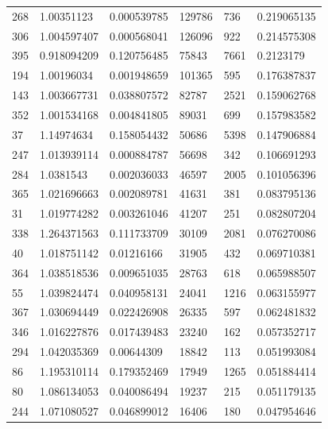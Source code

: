 \documentclass[withoutpreface,bwprint]{cumcmthesis}
\begin{document}
\begin{longtable}{l|llll|l}
    268  & 1.00351123   & 0.000539785  & 129786   & 736            & 0.219065135    \\
    306  & 1.004597407  & 0.000568041  & 126096   & 922            & 0.214575308    \\
    395  & 0.918094209  & 0.120756485  & 75843    & 7661           & 0.2123179      \\
    194  & 1.00196034   & 0.001948659  & 101365   & 595            & 0.176387837    \\
    143  & 1.003667731  & 0.038807572  & 82787    & 2521           & 0.159062768    \\
    352  & 1.001534168  & 0.004841805  & 89031    & 699            & 0.157983582    \\
    37   & 1.14974634   & 0.158054432  & 50686    & 5398           & 0.147906884    \\
    247  & 1.013939114  & 0.000884787  & 56698    & 342            & 0.106691293    \\
    284  & 1.0381543    & 0.002036033  & 46597    & 2005           & 0.101056396    \\
    365  & 1.021696663  & 0.002089781  & 41631    & 381            & 0.083795136    \\
    31   & 1.019774282  & 0.003261046  & 41207    & 251            & 0.082807204    \\
    338  & 1.264371563  & 0.111733709  & 30109    & 2081           & 0.076270086    \\
    40   & 1.018751142  & 0.01216166   & 31905    & 432            & 0.069710381    \\
    364  & 1.038518536  & 0.009651035  & 28763    & 618            & 0.065988507    \\
    55   & 1.039824474  & 0.040958131  & 24041    & 1216           & 0.063155977    \\
    367  & 1.030694449  & 0.022426908  & 26335    & 597            & 0.062481832    \\
    346  & 1.016227876  & 0.017439483  & 23240    & 162            & 0.057352717    \\
    294  & 1.042035369  & 0.00644309   & 18842    & 113            & 0.051993084    \\
    86   & 1.195310114  & 0.179352469  & 17949    & 1265           & 0.051884414    \\
    80   & 1.086134053  & 0.040086494  & 19237    & 215            & 0.051179135    \\
    244  & 1.071080527  & 0.046899012  & 16406    & 180            & 0.047954646    \\

\end{longtable}
\end{document}
